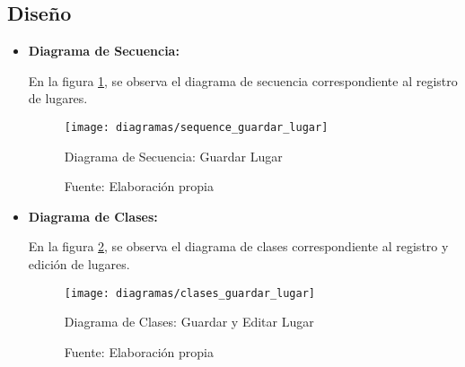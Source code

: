 
\subsection{Diseño}


\begin{itemize}
%
%


\item \textbf{Diagrama de Secuencia:}

En la figura \ref{fig:sequence_guardar_lugar}, se observa el diagrama de secuencia correspondiente al registro de lugares.


\begin{figure}[H]
  \begin{center}
    \texttt{[image: diagramas/sequence\_guardar\_lugar]}
  \end{center}
  \caption{Diagrama de Secuencia: Guardar Lugar}
  \label{fig:sequence_guardar_lugar}
  \caption*{Fuente: Elaboración propia}
\end{figure}


\item \textbf{Diagrama de Clases:}

En la figura \ref{fig:clases_guardar_lugar}, se observa el diagrama de clases correspondiente al registro y edición de lugares.

\begin{figure}[H]
\begin{center}
  \texttt{[image: diagramas/clases\_guardar\_lugar]}
\end{center}
\caption{Diagrama de Clases: Guardar y Editar Lugar}
\label{fig:clases_guardar_lugar}
\caption*{Fuente: Elaboración propia}
\end{figure}


\end{itemize}
